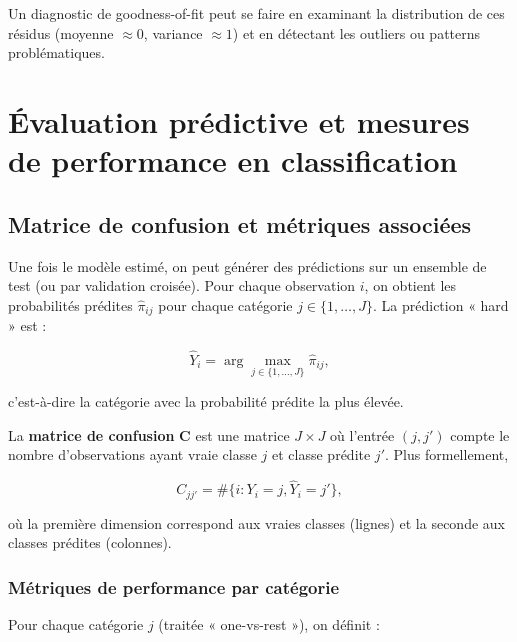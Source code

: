 \documentclass[12pt,a4paper]{article}
\begin{document}
Un diagnostic de goodness-of-fit peut se faire en examinant la distribution de ces résidus (moyenne $\approx 0$, variance $\approx 1$) et en détectant les outliers ou patterns problématiques.

\section{Évaluation prédictive et mesures de performance en classification}

\subsection{Matrice de confusion et métriques associées}

Une fois le modèle estimé, on peut générer des prédictions sur un ensemble de test (ou par validation croisée). Pour chaque observation $i$, on obtient les probabilités prédites $\widehat{\pi}_{ij}$ pour chaque catégorie $j \in \{1, \ldots, J\}$. La prédiction « hard » est :

\begin{equation}\label{eq:prediction-hard}
\widehat{Y}_i = \arg\max_{j \in \{1, \ldots, J\}} \widehat{\pi}_{ij},
\end{equation}

c'est-à-dire la catégorie avec la probabilité prédite la plus élevée.

La \textbf{matrice de confusion} $\mathbf{C}$ est une matrice $J \times J$ où l'entrée $(j, j')$ compte le nombre d'observations ayant vraie classe $j$ et classe prédite $j'$. Plus formellement,

\begin{equation}
C_{jj'} = \#\{ i : Y_i = j, \widehat{Y}_i = j' \},
\end{equation}

où la première dimension correspond aux vraies classes (lignes) et la seconde aux classes prédites (colonnes).

\subsubsection{Métriques de performance par catégorie}

Pour chaque catégorie $j$ (traitée « one-vs-rest »), on définit :
\end{document}
